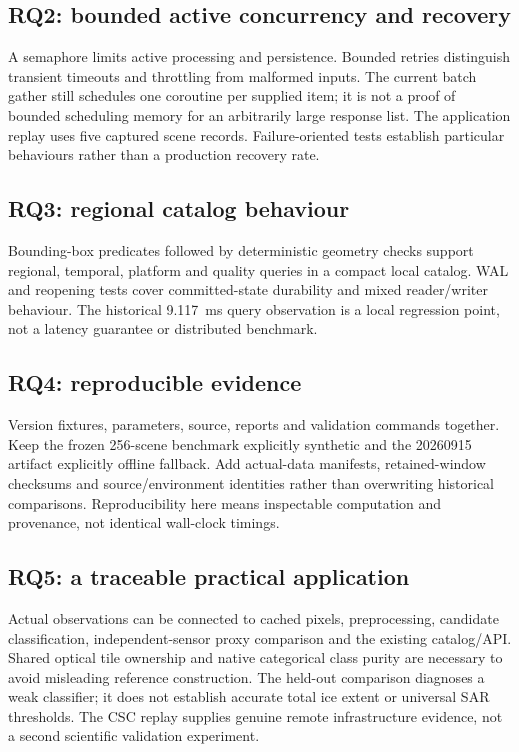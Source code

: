\subsection{RQ2: bounded active concurrency and recovery}

A semaphore limits active processing and persistence. Bounded retries distinguish transient
timeouts and throttling from malformed inputs. The current batch gather still schedules
one coroutine per supplied item; it is not a proof of bounded scheduling memory for an
arbitrarily large response list. The application replay uses five captured scene records.
Failure-oriented tests establish particular behaviours rather than a production recovery rate.

\subsection{RQ3: regional catalog behaviour}

Bounding-box predicates followed by deterministic geometry checks support regional,
temporal, platform and quality queries in a compact local catalog. WAL and reopening tests
cover committed-state durability and mixed reader/writer behaviour. The historical 9.117~ms
query observation is a local regression point, not a latency guarantee or distributed benchmark.

\subsection{RQ4: reproducible evidence}

Version fixtures, parameters, source, reports and validation commands together. Keep the
frozen 256-scene benchmark explicitly synthetic and the 20260915 artifact explicitly
offline fallback. Add actual-data manifests, retained-window checksums and source/environment
identities rather than overwriting historical comparisons. Reproducibility here means
inspectable computation and provenance, not identical wall-clock timings.

\subsection{RQ5: a traceable practical application}

Actual observations can be connected to cached pixels, preprocessing, candidate classification,
independent-sensor proxy comparison and the existing catalog/API. Shared optical tile
ownership and native categorical class purity are necessary to avoid misleading reference
construction. The held-out comparison diagnoses a weak classifier; it does not establish
accurate total ice extent or universal SAR thresholds. The CSC replay supplies genuine
remote infrastructure evidence, not a second scientific validation experiment.


